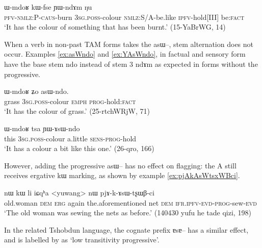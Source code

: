 \documentclass[oldfontcommands,oneside,a4paper,11pt]{article}
\newcommand{\ipa}[1]{{\phon \mbox{#1}}} %
\newcommand{\factual}[1]{\textsc{:fact}}
\begin{document}
\begin{exe}
\ex \label{ex:YWndAm}
\gll \ipa{kɤ-kɤ-sɯ-ɕke} 	\ipa{ɯ-mdoʁ} 	\ipa{kɯ-fse} 	\ipa{ɲɯ-ndɤm} 		\ipa{ŋu} \\
\textsc{pfv-nmlz:P-caus}-burn \textsc{3sg.poss}-colour \textsc{nmlz:S/A}-be.like \textsc{ipfv}-hold[III] be\factual{} \\
\glt  `It has the colour of something that has been burnt.' (15-YaBrWG, 14)
\end{exe}

When a verb in non-past TAM forms takes the \ipa{asɯ--}, stem alternation does not occur. Examples \ref{ex:asWndo} and \ref{ex:YAsWndo}, in factual and sensory form have the base stem \ipa{ndo} instead of stem 3 \ipa{ndɤm} as expected in forms without the progressive.


\begin{exe}
\ex \label{ex:asWndo}
\gll \ipa{sɯjno} 	\ipa{ɯ-mdoʁ} 	\ipa{ʑo} 	\ipa{asɯ-ndo.} \\
grass \textsc{3sg.poss}-colour \textsc{emph} \textsc{prog}-hold\factual{} \\
\glt `It has the colour of grass.' (25-rtchWRjW, 71)
\end{exe}


\begin{exe}
\ex \label{ex:YAsWndo}
\gll \ipa{kɯki} 	\ipa{ɯ-mdoʁ} 	\ipa{tsa} 	\ipa{ɲɯ-ɤsɯ-ndo} \\
this  \textsc{3sg.poss}-colour  a.little \textsc{sens-prog}-hold \\
\glt `It has a colour a bit like this one.' (26-qro, 166)
\end{exe}

However, adding the progressive \ipa{asɯ--} has no effect on flagging: the A still receives ergative \ipa{kɯ} marking, as shown by example \ref{ex:pjAkAsWtsxWBci}.

\begin{exe}
\ex \label{ex:pjAkAsWtsxWBci}
\gll \ipa{rgɤnmɯ}  	\ipa{nɯ}  	\ipa{kɯ}  	\ipa{li}  	\ipa{iɕqʰa}  	<yuwang>	\ipa{nɯ}  	\ipa{pjɤ-k-ɤsɯ-tʂɯβ-ci}  		\\
old.woman \textsc{dem} \textsc{erg} again the.aforementioned net \textsc{dem} \textsc{ifr.ipfv-evd-prog}-sew-\textsc{evd} \\
\glt `The old woman was sewing the nets as before.' (140430 yufu he tade qizi, 198)
\end{exe}


In the related Tshobdun language, the cognate prefix \ipa{ɐsɐ--} has a similar effect, and is labelled by \citet{jackson03caodeng} as `low transitivity progressive'.
\end{document}
